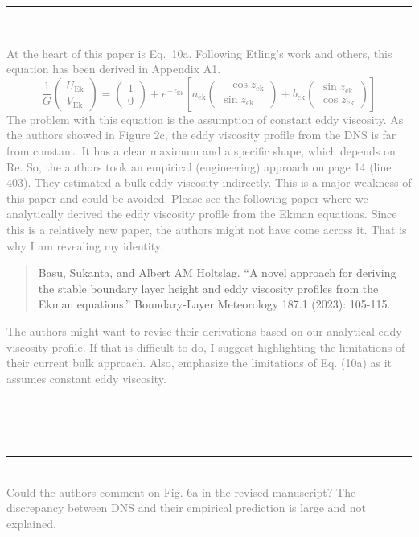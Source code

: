 \documentclass[a4paper,10pt]{article}
\newcommand{\revpoint}[3] 
{ \hrule ~\\[0.5em]
\noindent\textcolor{gray}{\noindent#1} \\[0.5em]  
\noindent\textcolor{blue}{\textit{\noindent#2}} \\[0.5em]
\noindent\textcolor{black}{\noindent{#3}} \\[0.5em]
}
\begin{document}
\revpoint{At the heart of this paper is Eq.~10a. Following Etling's work and others, this equation has been derived in Appendix A1. \newline 
  \[
    \frac{1}{G} \left(\begin{array}{c}U_\text{Ek} \\ V_\text{Ek} \end{array}\right) = \left(\begin{array}{c} 1 \\0 \end{array}\right) + e^{-z_\text{Ek}} \left[ a_\text{ek} \left(\begin{array}{c} -\cos z_\text{ek} \\ \sin z_\text{ek} \end{array}\right)+ b_\text{ek}\left(\begin{array}{c}\sin z_\text{ek} \\ \cos z_\text{ek}\end{array}\right)   \right]
  \] \newline  
  The problem with this equation is the assumption of constant eddy viscosity. As the authors showed in
  Figure 2c, the eddy viscosity profile from the DNS is far from constant. It has a clear maximum and a
  specific shape, which depends on Re.
  So, the authors took an empirical (engineering) approach on page 14 (line 403). They estimated a bulk
  eddy viscosity indirectly. This is a major weakness of this paper and could be avoided. Please see the
  following paper where we analytically derived the eddy viscosity profile from the Ekman equations.
  Since this is a relatively new paper, the authors might not have come across it. That is why I am revealing
  my identity.
  \begin{quotation}Basu, Sukanta, and Albert AM Holtslag. “A novel approach for deriving the stable
  boundary layer height and eddy viscosity profiles from the Ekman
  equations.” Boundary-Layer Meteorology 187.1 (2023): 105-115.
  \end{quotation}
  The authors might want to revise their derivations based on our analytical eddy viscosity profile. If that
  is difficult to do, I suggest highlighting the limitations of their current bulk approach. Also, emphasize
  the limitations of Eq. (10a) as it assumes constant eddy viscosity. }{}{}

\revpoint{Could the authors comment on Fig. 6a in the revised manuscript? The discrepancy between DNS and
  their empirical prediction is large and not explained.
}{}{}
\end{document}
